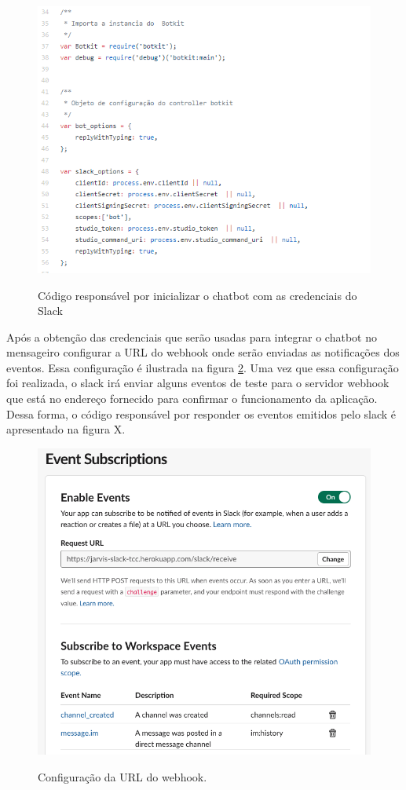 \begin{figure}[H]
  \centering
   \caption{Código responsável por inicializar o chatbot com as credenciais do Slack}
  \includegraphics[scale=0.8]{Imagens/config.png} 
  \label{token_codigo}
\end{figure}



Após a obtenção das credenciais que serão usadas para integrar o chatbot no mensageiro configurar a URL do webhook onde serão enviadas as notificações dos eventos. Essa configuração é ilustrada na figura \ref{webhook-slack-config}. Uma vez que essa configuração foi realizada, o slack irá enviar alguns eventos de teste para o servidor webhook que está no endereço fornecido para confirmar o funcionamento da aplicação. Dessa forma, o código responsável por responder os eventos emitidos pelo slack é apresentado na figura X. 


\begin{figure}[H]
  \centering
   \caption{Configuração da URL do webhook.}
  \includegraphics[scale=0.5]{Imagens/Slack_webhook_app.png} 
  \label{webhook-slack-config}
\end{figure}



